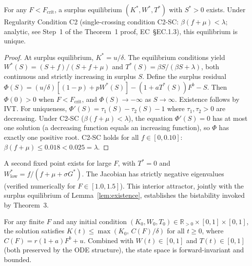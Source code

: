 \documentclass[msom,dblanonrev]{informs4}
\begin{document}
\begin{lemma}\label{lem:existence}
For any $F < F_{\mathrm{crit}}$, a surplus equilibrium $(K^*, W^*, T^*)$ with $S^* > 0$ exists. Under Regularity Condition C2 (single-crossing condition C2-SC: $\beta(f+\mu)<\lambda$; analytic, see Step~1 of the Theorem~1 proof, EC~\S EC.1.3), this equilibrium is unique.
\end{lemma}

\begin{proof}
At surplus equilibrium, $K^* = u/\delta$. The equilibrium conditions yield $W^*(S) = (S{+}f)/(S{+}f{+}\mu)$ and $T^*(S) = \beta S/(\beta S{+}\lambda)$, both continuous and strictly increasing in surplus $S$. Define the surplus residual $\Phi(S) = (u/\delta)[(1{-}p) + pW^*(S)] - (1{+}aT^*(S))F^b - S$. Then $\Phi(0) > 0$ when $F < F_{\mathrm{crit}}$, and $\Phi(S) \to -\infty$ as $S\to\infty$. Existence follows by IVT. For uniqueness, $\Phi'(S) = \tau_1(S) - \tau_2(S) - 1$ where $\tau_1, \tau_2 > 0$ are decreasing. Under C2-SC ($\beta(f{+}\mu) < \lambda$), the equation $\Phi'(S) = 0$ has at most one solution (a decreasing function equals an increasing function), so $\Phi$ has exactly one positive root. C2-SC holds for all $f \in [0, 0.10]$: $\beta(f{+}\mu) \leq 0.018 < 0.025 = \lambda$.\Halmos
\end{proof}

\begin{remark}\label{rem:low_trust}
A second fixed point exists for large $F$, with $T^*{=}0$ and $W^*_{\mathrm{low}} = f/(f{+}\mu{+}\sigma G^*)$. The Jacobian has strictly negative eigenvalues (verified numerically for $F \in [1.0, 1.5]$). This interior attractor, jointly with the surplus equilibrium of Lemma~\ref{lem:existence}, establishes the bistability invoked by Theorem~3.
\end{remark}

\begin{lemma}\label{lem:bounded}
For any finite $F$ and any initial condition $(K_0, W_0, T_0) \in \mathbb{R}_{>0} \times [0,1] \times [0,1]$, the solution satisfies $K(t) \leq \max(K_0,\, C(F)/\delta)$ for all $t \geq 0$, where $C(F) = r(1+a)F^b + u$. Combined with $W(t)\in[0,1]$ and $T(t)\in[0,1]$ (both preserved by the ODE structure), the state space is forward-invariant and bounded.
\end{lemma}
\end{document}
